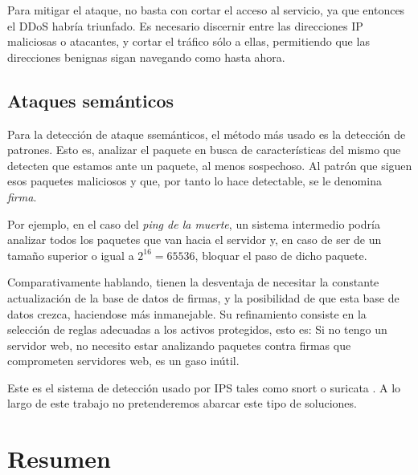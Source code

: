 
Para mitigar el ataque, no basta con cortar el acceso al servicio, ya que entonces el \gls{DDoS} habría triunfado. Es 
necesario discernir entre las direcciones IP maliciosas o atacantes, y cortar el tráfico sólo a ellas, permitiendo que 
las direcciones benignas sigan navegando como hasta ahora.

\subsection{Ataques semánticos}
Para la detección de ataque ssemánticos, el método más usado es la detección de patrones. Esto es, analizar el paquete 
en busca de características del mismo que detecten que estamos ante un paquete, al menos sospechoso. Al patrón que 
siguen esos paquetes maliciosos y que, por tanto lo hace detectable, se le denomina \emph{firma}.

Por ejemplo, en el caso del \emph{ping de la muerte}, un sistema intermedio podría analizar todos los paquetes que van 
hacia el servidor y, en caso de ser de un tamaño superior o igual a $2^16=65536$, bloquar el paso de dicho paquete.

Comparativamente hablando, tienen la desventaja de necesitar la constante actualización de la base de datos de firmas, 
y la posibilidad de que esta base de datos crezca, haciendose más inmanejable. Su refinamiento consiste en la selección 
de reglas adecuadas a los activos protegidos, esto es: Si no tengo un servidor web, no necesito estar analizando 
paquetes contra firmas que comprometen servidores web, es un gaso inútil.

Este es el sistema de detección usado por IPS tales como snort \cite{snort} o suricata \cite{suricata}. A lo largo de 
este trabajo no pretenderemos abarcar este tipo de soluciones.

\section{Resumen}%

